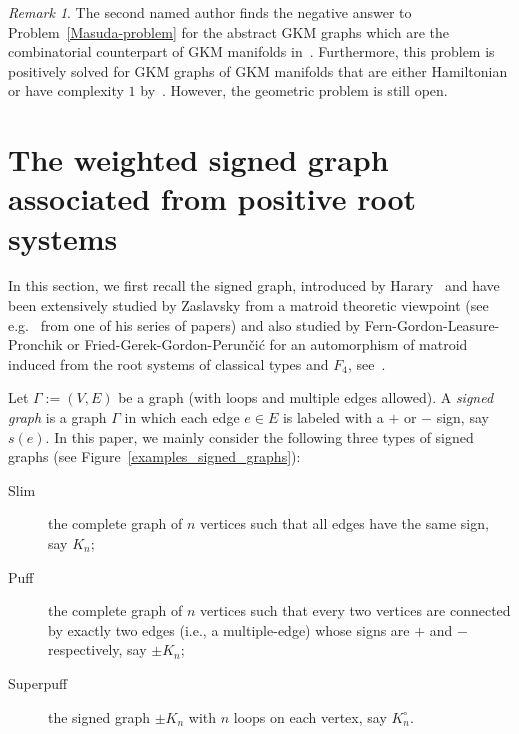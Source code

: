 \documentclass{amsart}
\theoremstyle{definition}
\theoremstyle{remark}
\newtheorem{remark}[theorem]{Remark}
\numberwithin{equation}{section}
\begin{document}

\begin{remark}
The second named author finds the negative answer to Problem~\ref{Masuda-problem} for the abstract GKM graphs which are the combinatorial counterpart of GKM manifolds in~\cite{So}. 
Furthermore, this problem is positively solved for GKM graphs of GKM manifolds that are either Hamiltonian or have complexity $1$ by~\cite{GS}.
However, the geometric problem is still open. 
\end{remark}

\section{The weighted signed graph associated from positive root systems}
\label{sect:4}

In this section, we first recall the signed graph, introduced by Harary~\cite{Ha} and have been extensively studied by Zaslavsky from a matroid theoretic viewpoint 
(see e.g.~\cite{Za} from one of his series of papers)
and also studied by Fern-Gordon-Leasure-Pronchik or Fried-Gerek-Gordon-Perun\v{c}i\'{c} for an automorphism of matroid induced from the root systems of classical types and $F_{4}$, see~\cite{FGLP, FGGP}.

Let $\Gamma:=(V,E)$ be a graph (with loops and multiple edges allowed).
A {\it signed graph} is a graph $\Gamma$ in which each edge $e\in E$ is labeled with a $+$ or $-$ sign, say $s(e)$.
In this paper, we mainly consider the following three types of signed graphs (see Figure~\ref{examples_signed_graphs}):

\begin{description}
\item[Slim] the complete graph of $n$ vertices such that all edges have the same sign, say $K_{n}$;
\item[Puff] the complete graph of $n$ vertices 
such that every two vertices are connected by exactly two edges (i.e., a multiple-edge) whose signs are $+$ and $-$ respectively, say $\pm K_{n}$;
\item[Superpuff] the signed graph $\pm K_{n}$ with $n$ loops on each vertex, say $K_{n}^{\circ}$.
\end{description}
\end{document}
